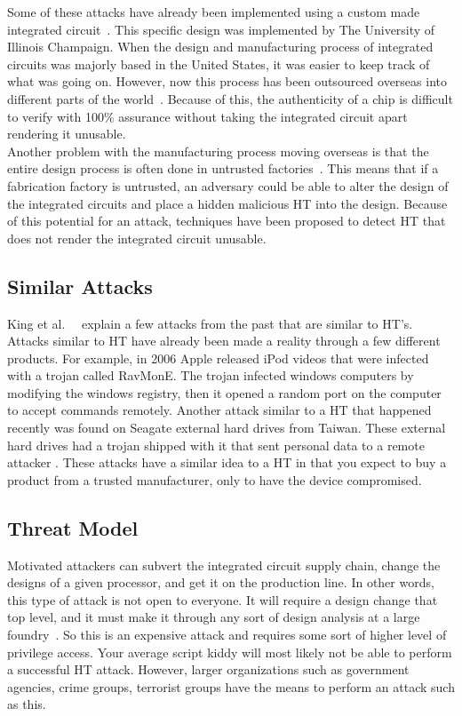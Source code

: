 \documentclass[letterpaper,twocolumn,11pt]{article}
\begin{document}
Some of these attacks have already been implemented using a custom made integrated circuit~\cite {king}. This specific design was implemented by The University of Illinois Champaign. When the design and manufacturing process of integrated circuits was majorly based in the United States, it was easier to keep track of what was going on. However, now this process has been outsourced overseas into different parts of the world~\cite {wei, teh}. Because of this, the authenticity of a chip is difficult to verify with 100\% assurance without taking the integrated circuit apart rendering it unusable.\\

Another problem with the manufacturing process moving overseas is that the entire design process is often done in untrusted factories~\cite {teh}. This means that if a fabrication factory is untrusted, an adversary could be able to alter the design of the integrated circuits and place a hidden malicious HT into the design. Because of this potential for an attack, techniques have been proposed to detect HT that does not render the integrated circuit unusable.

\subsection{Similar Attacks}
King et al.\ ~\cite {king} explain a few attacks from the past that are similar to HT's. Attacks similar to HT have already been made a reality through a few different products. For example, in 2006 Apple released iPod videos that were infected with a trojan called RavMonE. The trojan infected windows computers by modifying the windows registry, then it opened a random port on the computer to accept commands remotely. Another attack similar to a HT that happened recently was found on Seagate external hard drives from Taiwan. These external hard drives had a trojan shipped with it that sent personal data to a remote attacker \cite {king}. These attacks have a similar idea to a HT in that you expect to buy a product from a trusted manufacturer, only to have the device compromised. 

\subsection{Threat Model}
Motivated attackers can subvert the integrated circuit supply chain, change the designs of a given processor, and get it on the production line. In other words, this type of attack is not open to everyone. It will require a design change that top level, and it must make it through any sort of design analysis at a large foundry~\cite {teh}. So this is an expensive attack and requires some sort of higher level of privilege access. Your average script kiddy will most likely not be able to perform a successful HT attack. However, larger organizations such as government agencies, crime groups, terrorist groups have the means to perform an attack such as this. 
\end{document}
